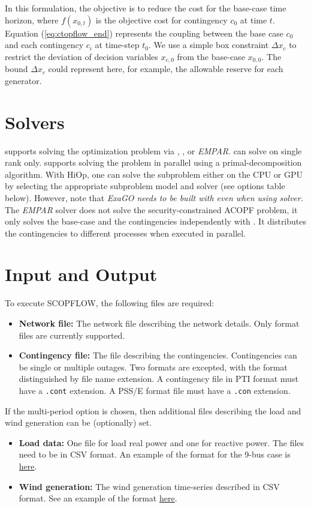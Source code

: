In this formulation, the objective is to reduce the cost for the base-case time
horizon, where $f(x_{0,t})$ is the objective cost for contingency $c_0$ at time
$t$. Equation (\ref{eq:ctopflow_end}) represents the coupling between the base
case $c_0$ and each contingency $c_i$ at time-step $t_0$. We use a simple box
constraint $\Delta x_c$ to restrict the  deviation of decision variables
$x_{c,0}$ from the base-case $x_{0,0}$. The bound $\Delta x_c$ could represent here, for example, the allowable reserve for each generator.

\section{Solvers}
\scopflow supports solving the optimization problem via \ipopt, \hiop, or \emph{EMPAR}. \ipopt can solve \scopflow on single rank only. \hiop supports solving the problem in parallel using a primal-decomposition algorithm. With HiOp, one can solve the subproblem either on the CPU or GPU by selecting the appropriate subproblem model and solver (see options table below).  However, note that \emph{ExaGO needs to be built with \ipopt even when using \hiop solver.} The \emph{EMPAR} solver does not solve the security-constrained ACOPF problem, it only solves the base-case and the contingencies independently with \opflow. It distributes the contingencies to different processes when executed in parallel.

\section{Input and Output}
To execute SCOPFLOW, the following files are required:
\begin{itemize}
    \item \textbf{Network file:} The network file describing the network details. Only \matpower format files are currently supported.
    \item \textbf{Contingency file:} The file describing the
      contingencies. Contingencies can be single or multiple
      outages. Two formats are excepted, with the format distinguished
      by file name extension.  A contingency file in PTI format must
      have a \texttt{.cont} extension.  A PSS/E format file must have
      a \texttt{.con} extension.
\end{itemize}
If the multi-period option is chosen, then additional files describing the load and wind generation can be (optionally) set.
\begin{itemize}
    \item \textbf{Load data:} One file for load real power and one for reactive power. The files need to be in CSV format. An example of the format for the 9-bus case is \href{https://github.com/ORNL/ExaGO/tree/develop/datafiles/case9}{here}.
    \item \textbf{Wind generation:} The wind generation time-series described in CSV format. See an example of the format \href{https://github.com/ORNL/ExaGO/tree/develop/datafiles/case9}{here}.
\end{itemize}

